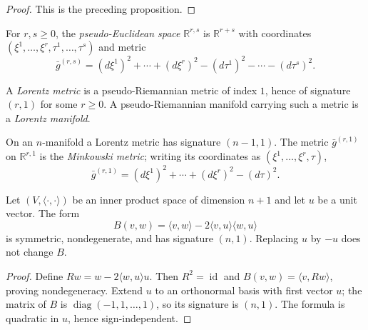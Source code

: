 \begin{proof}


\sketch This is the preceding proposition.
\end{proof}

For $r,s\geq0$, the \emph{pseudo-Euclidean space} $\mathbb R^{r,s}$ is
$\mathbb R^{r+s}$ with coordinates
$(\xi^1,\ldots,\xi^r,\tau^1,\ldots,\tau^s)$ and metric
\begin{equation}
\bar g^{(r,s)}=(d\xi^1)^2+\cdots+(d\xi^r)^2
 -(d\tau^1)^2-\cdots-(d\tau^s)^2. \tag{2.24}
\end{equation}

\begin{definition}
\label{def:lorentz-metric}





A \emph{Lorentz metric} is a pseudo-Riemannian metric of index $1$, hence of
signature $(r,1)$ for some $r\geq0$. A pseudo-Riemannian manifold carrying such a
metric is a \emph{Lorentz manifold}.
\end{definition}

On an $n$-manifold a Lorentz metric has signature $(n-1,1)$. The metric
$\bar g^{(r,1)}$ on $\mathbb R^{r,1}$ is the \emph{Minkowski metric}; writing its
coordinates as $(\xi^1,\ldots,\xi^r,\tau)$,
\begin{equation}
\bar g^{(r,1)}=(d\xi^1)^2+\cdots+(d\xi^r)^2-(d\tau)^2. \tag{2.25}
\end{equation}

\begin{lemma}
\label{lem:lorentz-form-pointwise}





Let $(V,\langle\cdot,\cdot\rangle)$ be an inner product space of dimension $n+1$
and let $u$ be a unit vector. The form
\[
B(v,w)=\langle v,w\rangle
 -2\langle v,u\rangle\langle w,u\rangle
\]
is symmetric, nondegenerate, and has signature $(n,1)$. Replacing $u$ by $-u$
does not change $B$.
\end{lemma}

\begin{proof}

\sketch Define $Rw=w-2\langle w,u\rangle u$. Then $R^2=\operatorname{id}$ and
$B(v,w)=\langle v,Rw\rangle$, proving nondegeneracy. Extend $u$ to an orthonormal
basis with first vector $u$; the matrix of $B$ is
$\operatorname{diag}(-1,1,\ldots,1)$, so its signature is $(n,1)$. The formula is
quadratic in $u$, hence sign-independent.
\end{proof}

